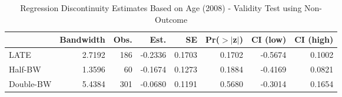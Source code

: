 \begin{table}[ht]
\centering
\begin{tabular}{lrrrrrrr}
  \hline
 & Bandwidth & Obs. & Est. & SE & Pr($>$$|$z$|$) & CI (low) & CI (high) \\ 
  \hline
LATE & 2.7192 & 186 & -0.2336 & 0.1703 & 0.1702 & -0.5674 & 0.1002 \\ 
  Half-BW & 1.3596 & 60 & -0.1674 & 0.1273 & 0.1884 & -0.4169 & 0.0821 \\ 
  Double-BW & 5.4384 & 301 & -0.0680 & 0.1191 & 0.5680 & -0.3014 & 0.1654 \\ 
   \hline
\end{tabular}
\caption{Regression Discontinuity Estimates Based on Age (2008) - Validity Test using Non-Outcome} 
\label{tab:rd2008y_non}
\end{table}
